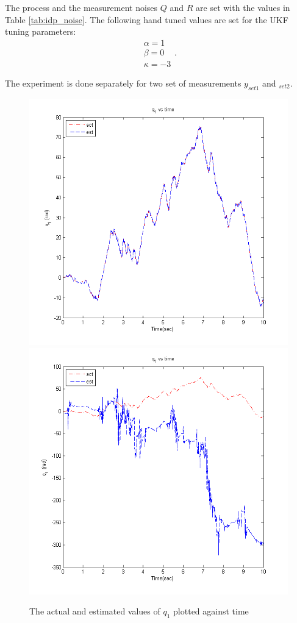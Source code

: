 The process and the measurement noises $Q$ and $R$ are set with the values in Table \ref{tab:idp_noise}. The following hand tuned values are set for the UKF tuning parameters:
$$  \begin{aligned}
    \alpha = 1 \\
    \beta = 0\\
    \kappa = -3 
    \end{aligned} .$$ 

The experiment is done separately for two set of measurements $y_{set1}$ and $_{set2}$.
\begin{figure}
	\centering
	\includegraphics[height=0.48\textheight,width=\textwidth]{Bilder/plots/ukf_case/lin_msr.png}
	\includegraphics[height=0.48\textheight,width=\textwidth]{Bilder/plots/ukf_case/nlin_msr.png}
	\caption{ The actual and estimated values of $q_1$ plotted against time}
	\label{fig:ukf_msr}
\end{figure}

